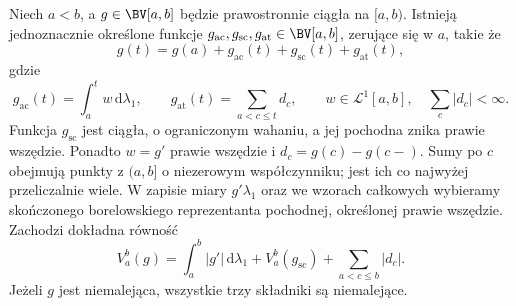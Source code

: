 \begin{twierdzenie}
\label{it:thm:stieltjes-generator-decomposition}
Niech $a<b$, a $g\in\BV[a,b]$ będzie prawostronnie ciągła
na $[a,b)$. Istnieją jednoznacznie określone funkcje
$g_{\mathrm{ac}},g_{\mathrm{sc}},g_{\mathrm{at}}\in\BV[a,b]$,
zerujące się w $a$, takie że
\[
 g(t)=g(a)+g_{\mathrm{ac}}(t)+g_{\mathrm{sc}}(t)+g_{\mathrm{at}}(t),
\]
gdzie
\[
 g_{\mathrm{ac}}(t)=\int_a^t w\,\mathrm d\lambda_1,\qquad
 g_{\mathrm{at}}(t)=\sum_{a<c\le t}d_c,
 \qquad w\in\mathcal L^1[a,b],\quad \sum_c|d_c|<\infty.
\]
Funkcja $g_{\mathrm{sc}}$ jest ciągła, o ograniczonym
wahaniu, a jej pochodna znika prawie wszędzie.
Ponadto $w=g'$ prawie wszędzie i $d_c=g(c)-g(c-)$.
Sumy po $c$ obejmują punkty z $(a,b]$ o niezerowym
współczynniku; jest ich co najwyżej przeliczalnie wiele.
W zapisie miary $g'\lambda_1$ oraz we wzorach całkowych
wybieramy skończonego borelowskiego reprezentanta
pochodnej, określonej prawie wszędzie.
Zachodzi dokładna równość
\[
 V_a^b(g)=\int_a^b|g'|\,\mathrm d\lambda_1+
 V_a^b(g_{\mathrm{sc}})+\sum_{a<c\le b}|d_c|.
\]
Jeżeli $g$ jest niemalejąca, wszystkie trzy składniki
są niemalejące.
\end{twierdzenie}
